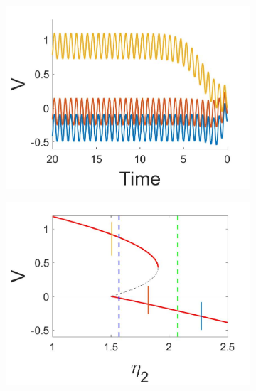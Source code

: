 \begin{figure}[H]
\centering
\begin{subfigure}{.5\textwidth}
 \centering
 \includegraphics[width=\linewidth]{twoD/osc_Vtimeseries.jpg}
 \caption{}
\end{subfigure}%
\begin{subfigure}{.5\textwidth}
 \centering
 \includegraphics[width=\linewidth]{twoD/osc_bif_diagram.jpg}
 \caption{}
\end{subfigure}
\begin{subfigure}{.5\textwidth}
 \centering

\end{subfigure}
\end{figure}
